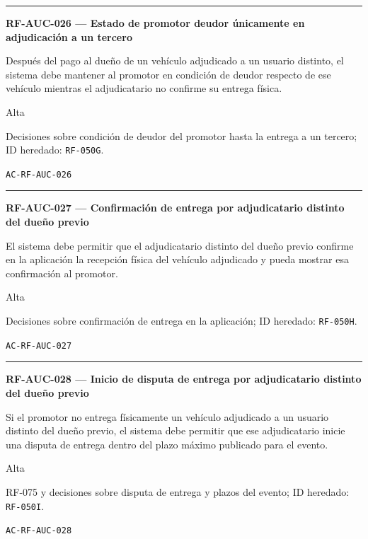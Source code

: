 \documentclass[10pt,letterpaper]{article}
\begin{document}
\vspace{0.25em}\hrule\vspace{0.65em}
\noindent\textbf{RF-AUC-026 --- Estado de promotor deudor únicamente en adjudicación a un tercero}\par
\begin{description}[style=nextline,leftmargin=3.15cm,labelwidth=2.8cm,font=\normalfont\bfseries]
\item[Obligación] Después del pago al dueño de un vehículo adjudicado a un usuario distinto, el sistema debe mantener al promotor en condición de deudor respecto de ese vehículo mientras el adjudicatario no confirme su entrega física.
\item[Prioridad] Alta
\item[Procedencia] Decisiones sobre condición de deudor del promotor hasta la entrega a un tercero; ID heredado: \texttt{RF-050G}.
\item[Verificación] \texttt{AC-RF-AUC-026}
\end{description}
\vspace{0.25em}\hrule\vspace{0.65em}
\noindent\textbf{RF-AUC-027 --- Confirmación de entrega por adjudicatario distinto del dueño previo}\par
\begin{description}[style=nextline,leftmargin=3.15cm,labelwidth=2.8cm,font=\normalfont\bfseries]
\item[Obligación] El sistema debe permitir que el adjudicatario distinto del dueño previo confirme en la aplicación la recepción física del vehículo adjudicado y pueda mostrar esa confirmación al promotor.
\item[Prioridad] Alta
\item[Procedencia] Decisiones sobre confirmación de entrega en la aplicación; ID heredado: \texttt{RF-050H}.
\item[Verificación] \texttt{AC-RF-AUC-027}
\end{description}
\vspace{0.25em}\hrule\vspace{0.65em}
\noindent\textbf{RF-AUC-028 --- Inicio de disputa de entrega por adjudicatario distinto del dueño previo}\par
\begin{description}[style=nextline,leftmargin=3.15cm,labelwidth=2.8cm,font=\normalfont\bfseries]
\item[Obligación] Si el promotor no entrega físicamente un vehículo adjudicado a un usuario distinto del dueño previo, el sistema debe permitir que ese adjudicatario inicie una disputa de entrega dentro del plazo máximo publicado para el evento.
\item[Prioridad] Alta
\item[Procedencia] RF-075 y decisiones sobre disputa de entrega y plazos del evento; ID heredado: \texttt{RF-050I}.
\item[Verificación] \texttt{AC-RF-AUC-028}
\end{description}
\end{document}
